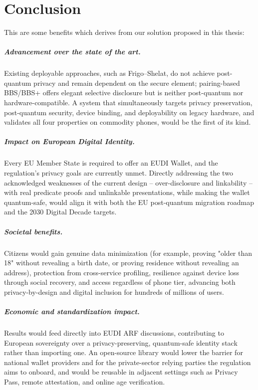 \documentclass[binding=0.6cm,oneside,noexaminfo]{sapthesis}
\begin{document}
\chapter{Conclusion}
\label{sec:conclusion}

This are some benefits which derives from our solution proposed in this thesis:

\paragraph{Advancement over the state of the art.} Existing deployable approaches, such as Frigo--Shelat, do not achieve post-quantum privacy and remain dependent on the secure element; pairing-based BBS/BBS+ offers elegant selective disclosure but is neither post-quantum nor hardware-compatible. A system that simultaneously targets privacy preservation, post-quantum security, device binding, and deployability on legacy hardware, and validates all four properties on commodity phones, would be the first of its kind.
\paragraph{Impact on European Digital Identity.} Every EU Member State is required to offer an EUDI Wallet, and the regulation's privacy goals are currently unmet. Directly addressing the two acknowledged weaknesses of the current design -- over-disclosure and linkability -- with real predicate proofs and unlinkable presentations, while making the wallet quantum-safe, would align it with both the EU post-quantum migration roadmap and the 2030 Digital Decade targets.
\paragraph{Societal benefits.} Citizens would gain genuine data minimization (for example, proving "older than 18" without revealing a birth date, or proving residence without revealing an address), protection from cross-service profiling, resilience against device loss through social recovery, and access regardless of phone tier, advancing both privacy-by-design and digital inclusion for hundreds of millions of users.
\paragraph{Economic and standardization impact.} Results would feed directly into EUDI ARF discussions, contributing to European sovereignty over a privacy-preserving, quantum-safe identity stack rather than importing one. An open-source library would lower the barrier for national wallet providers and for the private-sector relying parties the regulation aims to onboard, and would be reusable in adjacent settings such as Privacy Pass, remote attestation, and online age verification.
\end{document}
